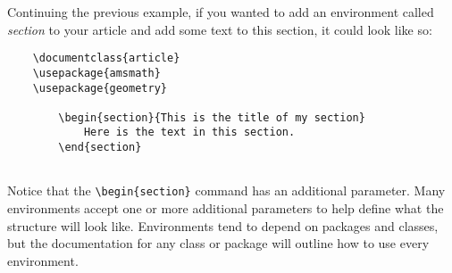 Continuing the previous example, if you wanted to add an environment called \emph{section} to your article and add some text to this section, it could look like so:
\begin{lstlisting}
	\documentclass{article}
	\usepackage{amsmath}
	\usepackage{geometry}
	
		\begin{section}{This is the title of my section}
			Here is the text in this section.
		\end{section}
	
\end{lstlisting}
Notice that the \verb|\begin{section}| command has an additional parameter. Many environments accept one or more additional parameters to help define what the structure will look like. Environments tend to depend on packages and classes, but the documentation for any class or package will outline how to use every environment. 